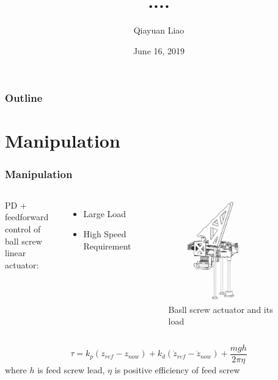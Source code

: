 \documentclass{beamer}
\title{....}
\author{Qiayuan Liao\inst{1}}
\date{June 16, 2019}
\institute[] %
{
  \inst{1}
  liaoqiayuan@gmail.com
}
\begin{document}
\begin{frame}
  \titlepage
\end{frame}

\begin{frame}
  \frametitle{Outline}
  \tableofcontents
\end{frame}

\section{Manipulation}

\begin{frame}
  \frametitle{Manipulation}
  \vspace{-2.0cm}
  \begin{columns}
    PD + feedforward control of ball screw linear actuator:
    \begin{itemize}
      \item Large Load
      \item High Speed Requirement
    \end{itemize}

    \begin{figure}
      \includegraphics[width = 0.8\textwidth]{fig/screw.jpg}
      \caption{Basll screw actuator and its load}
    \end{figure}
  \end{columns}
  \begin{equation}
    \tau = k_p(z_{ref}-z_{now})+k_d(\dot{z}_{ref}-\dot{z}_{now})+ \frac{mgh}{2\pi \eta}
  \end{equation}
  where $h$ is feed screw lead, $\eta$ is positive efficiency of feed screw
\end{frame}
\end{document}
